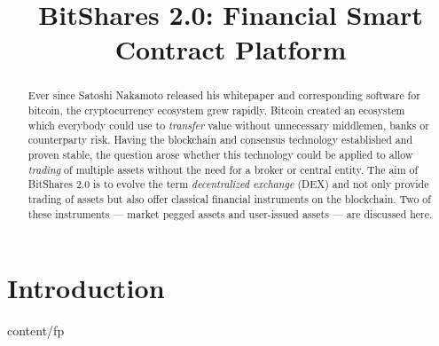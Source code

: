 \documentclass{btswhitepaper}
\title{BitShares 2.0: Financial Smart Contract Platform}
\begin{document}
\sloppy
\maketitle

\begin{abstract}%
 Ever since Satoshi Nakamoto released his whitepaper and corresponding software
 for bitcoin, the cryptocurrency ecosystem grew rapidly. Bitcoin created an
 ecosystem which everybody could use to \emph{transfer} value without
 unnecessary middlemen, banks or counterparty risk. Having the blockchain
 and consensus technology established and proven stable, the question arose
 whether this technology could be applied to allow \emph{trading} of multiple
 assets without the need for a broker or central entity.
 The aim of BitShares 2.0 is to evolve the term \emph{decentralized exchange}
 (DEX) and not only provide trading of assets but also offer classical
 financial instruments on the blockchain. Two of these instruments --- market
 pegged assets and user-issued assets --- are discussed here.

\end{abstract}




\section        { Introduction                                     }  { content/fp                     } 
\end{document}
